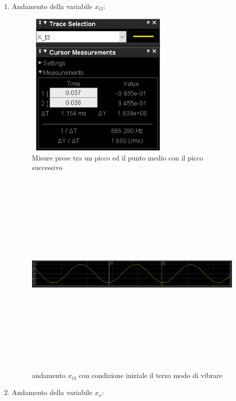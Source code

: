 \documentclass{article}
\begin{document}
\begin{enumerate}
    \item 
Andamento della variabile $x_{t3}$:
\begin{figure}[H]
\centering
\includegraphics[width=7cm,height=7cm,keepaspectratio]{./simulink/assex/modo3_t3tab.png}
\caption{Misure prese tra un picco ed il punto medio con il picco successivo}
\end{figure}

\begin{figure}[H]
\centering
\includegraphics[width=12cm,height=10cm,keepaspectratio]{./simulink/assex/modo3_t3.png}
\caption{andamento $x_{t3}$ con condizione iniziale il terzo modo di vibrare}
\end{figure}


    \item
       Andamento della variabile $x_{x}$:
      

\end{enumerate}
\end{document}
